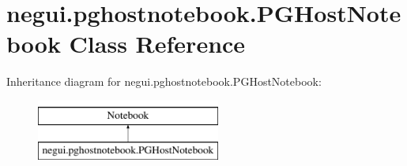 \hypertarget{classnegui_1_1pghostnotebook_1_1PGHostNotebook}{}\section{negui.\+pghostnotebook.\+P\+G\+Host\+Notebook Class Reference}
\label{classnegui_1_1pghostnotebook_1_1PGHostNotebook}
Inheritance diagram for negui.\+pghostnotebook.\+P\+G\+Host\+Notebook\+:\begin{figure}[H]
\begin{center}
\leavevmode
\includegraphics[height=2.000000cm]{classnegui_1_1pghostnotebook_1_1PGHostNotebook}
\end{center}
\end{figure}
